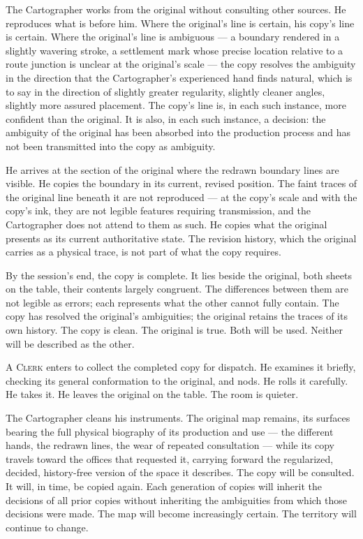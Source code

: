 \documentclass[12pt, oneside]{article}
\newenvironment{action}{%
  \vspace{0.6em}%
  \noindent\ignorespaces%
}{%
  \par\vspace{0.6em}%
}
\begin{document}
\begin{action}
The Cartographer works from the original without consulting other sources. He reproduces what is before him. Where the original's line is certain, his copy's line is certain. Where the original's line is ambiguous --- a boundary rendered in a slightly wavering stroke, a settlement mark whose precise location relative to a route junction is unclear at the original's scale --- the copy resolves the ambiguity in the direction that the Cartographer's experienced hand finds natural, which is to say in the direction of slightly greater regularity, slightly cleaner angles, slightly more assured placement. The copy's line is, in each such instance, more confident than the original. It is also, in each such instance, a decision: the ambiguity of the original has been absorbed into the production process and has not been transmitted into the copy as ambiguity.

He arrives at the section of the original where the redrawn boundary lines are visible. He copies the boundary in its current, revised position. The faint traces of the original line beneath it are not reproduced --- at the copy's scale and with the copy's ink, they are not legible features requiring transmission, and the Cartographer does not attend to them as such. He copies what the original presents as its current authoritative state. The revision history, which the original carries as a physical trace, is not part of what the copy requires.
\end{action}

\begin{action}
By the session's end, the copy is complete. It lies beside the original, both sheets on the table, their contents largely congruent. The differences between them are not legible as errors; each represents what the other cannot fully contain. The copy has resolved the original's ambiguities; the original retains the traces of its own history. The copy is clean. The original is true. Both will be used. Neither will be described as the other.

A \textsc{Clerk} enters to collect the completed copy for dispatch. He examines it briefly, checking its general conformation to the original, and nods. He rolls it carefully. He takes it. He leaves the original on the table. The room is quieter.

The Cartographer cleans his instruments. The original map remains, its surfaces bearing the full physical biography of its production and use --- the different hands, the redrawn lines, the wear of repeated consultation --- while its copy travels toward the offices that requested it, carrying forward the regularized, decided, history-free version of the space it describes. The copy will be consulted. It will, in time, be copied again. Each generation of copies will inherit the decisions of all prior copies without inheriting the ambiguities from which those decisions were made. The map will become increasingly certain. The territory will continue to change.
\end{action}
\end{document}
